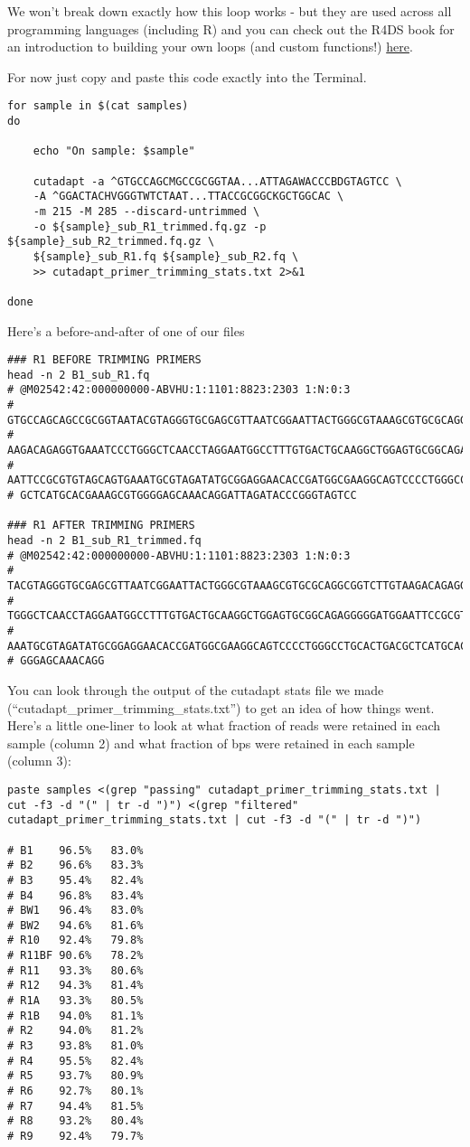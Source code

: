 \documentclass[
]{book}
\begin{document}
We won't break down exactly how this loop works - but they are used across all programming languages (including R) and you can check out the R4DS book for an introduction to building your own loops (and custom functions!) \href{https://r4ds.had.co.nz/iteration.html}{here}.

For now just copy and paste this code exactly into the Terminal.

\begin{verbatim}
for sample in $(cat samples)
do

    echo "On sample: $sample"
    
    cutadapt -a ^GTGCCAGCMGCCGCGGTAA...ATTAGAWACCCBDGTAGTCC \
    -A ^GGACTACHVGGGTWTCTAAT...TTACCGCGGCKGCTGGCAC \
    -m 215 -M 285 --discard-untrimmed \
    -o ${sample}_sub_R1_trimmed.fq.gz -p ${sample}_sub_R2_trimmed.fq.gz \
    ${sample}_sub_R1.fq ${sample}_sub_R2.fq \
    >> cutadapt_primer_trimming_stats.txt 2>&1

done
\end{verbatim}

Here's a before-and-after of one of our files

\begin{verbatim}
### R1 BEFORE TRIMMING PRIMERS
head -n 2 B1_sub_R1.fq
# @M02542:42:000000000-ABVHU:1:1101:8823:2303 1:N:0:3
# GTGCCAGCAGCCGCGGTAATACGTAGGGTGCGAGCGTTAATCGGAATTACTGGGCGTAAAGCGTGCGCAGGCGGTCTTGT
# AAGACAGAGGTGAAATCCCTGGGCTCAACCTAGGAATGGCCTTTGTGACTGCAAGGCTGGAGTGCGGCAGAGGGGGATGG
# AATTCCGCGTGTAGCAGTGAAATGCGTAGATATGCGGAGGAACACCGATGGCGAAGGCAGTCCCCTGGGCCTGCACTGAC
# GCTCATGCACGAAAGCGTGGGGAGCAAACAGGATTAGATACCCGGGTAGTCC

### R1 AFTER TRIMMING PRIMERS
head -n 2 B1_sub_R1_trimmed.fq
# @M02542:42:000000000-ABVHU:1:1101:8823:2303 1:N:0:3
# TACGTAGGGTGCGAGCGTTAATCGGAATTACTGGGCGTAAAGCGTGCGCAGGCGGTCTTGTAAGACAGAGGTGAAATCCC
# TGGGCTCAACCTAGGAATGGCCTTTGTGACTGCAAGGCTGGAGTGCGGCAGAGGGGGATGGAATTCCGCGTGTAGCAGTG
# AAATGCGTAGATATGCGGAGGAACACCGATGGCGAAGGCAGTCCCCTGGGCCTGCACTGACGCTCATGCACGAAAGCGTG
# GGGAGCAAACAGG
\end{verbatim}

You can look through the output of the cutadapt stats file we made (``cutadapt\_primer\_trimming\_stats.txt'') to get an idea of how things went. Here's a little one-liner to look at what fraction of reads were retained in each sample (column 2) and what fraction of bps were retained in each sample (column 3):

\begin{verbatim}
paste samples <(grep "passing" cutadapt_primer_trimming_stats.txt | cut -f3 -d "(" | tr -d ")") <(grep "filtered" cutadapt_primer_trimming_stats.txt | cut -f3 -d "(" | tr -d ")")

# B1    96.5%   83.0%
# B2    96.6%   83.3%
# B3    95.4%   82.4%
# B4    96.8%   83.4%
# BW1   96.4%   83.0%
# BW2   94.6%   81.6%
# R10   92.4%   79.8%
# R11BF 90.6%   78.2%
# R11   93.3%   80.6%
# R12   94.3%   81.4%
# R1A   93.3%   80.5%
# R1B   94.0%   81.1%
# R2    94.0%   81.2%
# R3    93.8%   81.0%
# R4    95.5%   82.4%
# R5    93.7%   80.9%
# R6    92.7%   80.1%
# R7    94.4%   81.5%
# R8    93.2%   80.4%
# R9    92.4%   79.7%
\end{verbatim}
\end{document}

